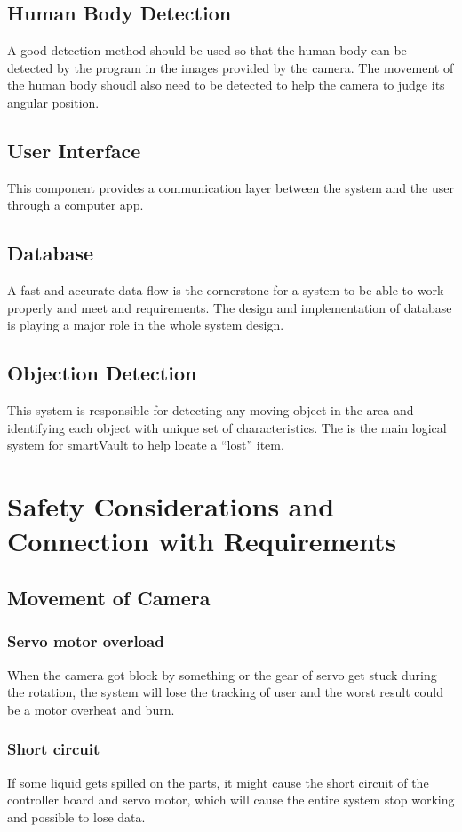 \documentclass{article}
\begin{document}
\subsection{Human Body Detection}
A good detection method should be used so that the human body can be detected by the program in the images provided by the camera. The movement of the human body shoudl also need to be detected to help the camera to judge its angular position.
\subsection{User Interface}
This component provides a communication layer between the system and the user through a computer app.
\subsection{Database}
A fast and accurate data flow is the cornerstone for a system to be able to work properly and meet and requirements. The design and implementation of database is playing a major role in the whole system design.
\subsection{Objection Detection}
This system is responsible for detecting any moving object in the area and identifying each object with unique set of characteristics. The is the main logical system for smartVault to help locate a “lost” item.
\section{Safety Considerations and Connection with Requirements}
\subsection{Movement of Camera}
\subsubsection{Servo motor overload}
When the camera got block by something or the gear of servo get stuck during the rotation, the system will lose the tracking of user and the worst result could be a motor overheat and burn.
\subsubsection{Short circuit}
If some liquid gets spilled on the parts, it might cause the short circuit of the controller board and servo motor, which will cause the entire system stop working and possible to lose data.
\end{document}
